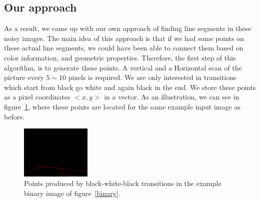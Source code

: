\documentclass[	DIV=calc,%
							paper=a4,%
							fontsize=11pt,%
							twocolumn]{scrartcl}	 					%
\begin{document}
\subsection{Our approach}
As a result, we came up with our own approach of finding line segments in these noisy images. The main idea of this approach is that if we had some points on these actual line segments, we could have been able to connect them based on color information, and geometric properties. Therefore, the first step of this algorithm, is to generate these points. A vertical and a Horizontal scan of the picture every $5 \sim 10$ pixels is required. We are only interested in transitions which start from black go white and again black in the end. We store these points as a pixel coordinates $<x,y>$ in a vector. As an illustration, we can see in figure~\ref{points}, where these points are located for the same example input image as before.
\begin{figure}[t!]
\caption{Points produced by black-white-black transitions in the example binary image of figure~\ref{binary}.}
\label{points}
\centering    
\includegraphics[width=0.3\textwidth]{figures/points.png}
\end{figure}
\end{document}
